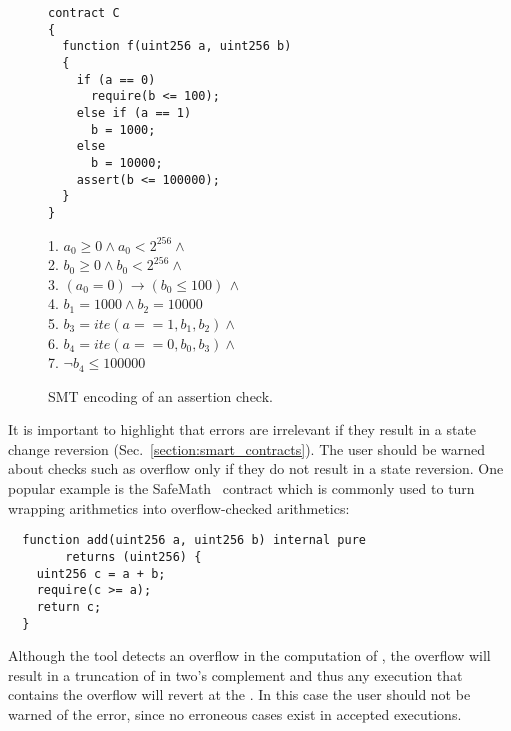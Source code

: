 \begin{figure}
\label{figure:solidity_encoding_1}
\noindent\begin{minipage}{.48\textwidth}
\begin{verbatim}
contract C
{
  function f(uint256 a, uint256 b)
  {
    if (a == 0)
      require(b <= 100);
    else if (a == 1)
      b = 1000;
    else
      b = 10000;
    assert(b <= 100000);
  }
}
\end{verbatim}
\end{minipage}\hfill
\begin{minipage}{.48\textwidth}
1. $a_0 \ge 0 \land a_0 < 2^{256}  \land \phantom{x}$\\
2. $b_0 \ge 0 \land b_0 < 2^{256}  \land \phantom{x}$\\
3. $(a_0 = 0) \rightarrow (b_0 \le 100) \, \land$\\
4. $b_1 = 1000 \land b_2 = 10000$\\
5. $b_3 = ite(a == 1, b_1, b_2) \land \phantom{x}$\\
6. $b_4 = ite(a == 0, b_0, b_3) \land \phantom{x}$\\
7. $\neg b_4 \le 100000$
\end{minipage}
\caption{SMT encoding of an assertion check.}
\end{figure}

It is important to highlight that errors are irrelevant if they result in a
state change reversion (Sec.~\ref{section:smart_contracts}). The user should be warned
about checks such as overflow only if they do not result in a state reversion.
%
One popular example is the SafeMath~\cite{SafeMath} contract which
is commonly used to turn wrapping arithmetics into overflow-checked arithmetics:

\begin{verbatim}
  function add(uint256 a, uint256 b) internal pure
        returns (uint256) {
    uint256 c = a + b;
    require(c >= a);
    return c;
  }
\end{verbatim}

Although the tool detects an overflow in the computation of ,
the overflow will result in a truncation of  in two's complement and thus
any execution that contains the overflow will revert at the .
%
In this case the user should not be warned of the error, since no erroneous cases
exist in accepted executions.


